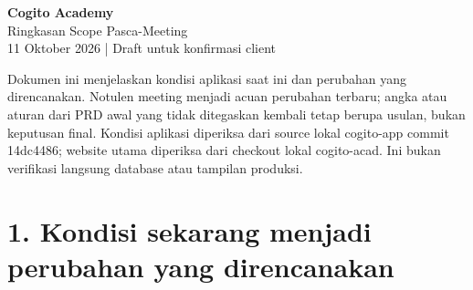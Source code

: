 \documentclass[10pt,a4paper]{article}
\begin{document}
\begin{center}{\LARGE\bfseries Cogito Academy}\\[5pt]
{\Large Ringkasan Scope Pasca-Meeting}\\[6pt]
{\small 11 Oktober 2026 | Draft untuk konfirmasi client}
\end{center}



Dokumen ini menjelaskan kondisi aplikasi saat ini dan perubahan yang direncanakan. Notulen meeting menjadi acuan perubahan terbaru; angka atau aturan dari PRD awal yang tidak ditegaskan kembali tetap berupa usulan, bukan keputusan final. Kondisi aplikasi diperiksa dari source lokal cogito-app commit 14dc4486; website utama diperiksa dari checkout lokal cogito-acad. Ini bukan verifikasi langsung database atau tampilan produksi.

\section*{1. Kondisi sekarang  menjadi  perubahan yang direncanakan}
\end{document}
